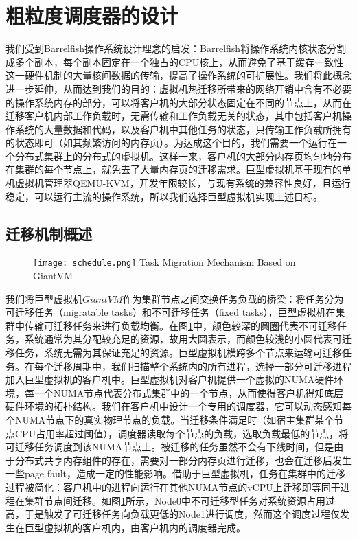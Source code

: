 \section{粗粒度调度器的设计}
我们受到Barrelfish操作系统设计理念的启发：Barrelfish将操作系统内核状态分割成多个副本，每个副本固定在一个独占的CPU核上，从而避免了基于缓存一致性这一硬件机制的大量核间数据的传输，提高了操作系统的可扩展性。我们将此概念进一步延伸，从而达到我们的目的：虚拟机热迁移所带来的网络开销中含有不必要的操作系统内存的部分，可以将客户机的大部分状态固定在不同的节点上，从而在迁移客户机内部工作负载时，无需传输和工作负载无关的状态，其中包括客户机操作系统的大量数据和代码，以及客户机中其他任务的状态，只传输工作负载所拥有的状态即可（如其频繁访问的内存页）。为达成这个目的，我们需要一个运行在一个分布式集群上的分布式的虚拟机。这样一来，客户机的大部分内存页均匀地分布在集群的每个节点上，就免去了大量内存页的迁移需求。巨型虚拟机基于现有的单机虚拟机管理器QEMU-KVM，开发年限较长，与现有系统的兼容性良好，且运行稳定，可以运行主流的操作系统，所以我们选择巨型虚拟机实现上述目标。

\subsection{迁移机制概述}

\begin{figure}[!htp]
  \centering
  \texttt{[image: schedule.png]}
    {Task Migration Mechanism Based on GiantVM}
  \label{fig:schedule}
\end{figure}

我们将巨型虚拟机$GiantVM$作为集群节点之间交换任务负载的桥梁：将任务分为可迁移任务（migratable tasks）和不可迁移任务（fixed tasks），巨型虚拟机在集群中传输可迁移任务来进行负载均衡。在图\ref{fig:schedule}中，颜色较深的圆圈代表不可迁移任务，系统通常为其分配较充足的资源，故用大圆表示，而颜色较浅的小圆代表可迁移任务，系统无需为其保证充足的资源。巨型虚拟机横跨多个节点来运输可迁移任务。在每个迁移周期中，我们扫描整个系统内的所有进程，选择一部分可迁移进程加入巨型虚拟机的客户机中。巨型虚拟机对客户机提供一个虚拟的NUMA硬件环境，每一个NUMA节点代表分布式集群中的一个节点，从而使得客户机得知底层硬件环境的拓扑结构。我们在客户机中设计一个专用的调度器，它可以动态感知每个NUMA节点下的真实物理节点的负载。当迁移条件满足时（如宿主集群某个节点CPU占用率超过阈值），调度器读取每个节点的负载，选取负载最低的节点，将可迁移任务调度到该NUMA节点上。被迁移的任务虽然不会有下线时间，但是由于分布式共享内存组件的存在，需要对一部分内存页进行迁移，也会在迁移后发生一些page fault，造成一定的性能影响。借助于巨型虚拟机，任务在集群中的迁移过程被简化：客户机中的进程向运行在其他NUMA节点的vCPU上迁移即等同于进程在集群节点间迁移。如图\ref{fig:schedule}所示，Node0中不可迁移型任务对系统资源占用过高，于是触发了可迁移任务向负载更低的Node1进行调度，然而这个调度过程仅发生在巨型虚拟机的客户机内，由客户机内的调度器完成。

